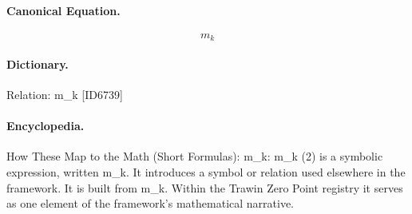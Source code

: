 \paragraph{Canonical Equation.}
\[
m_k
\]

\paragraph{Dictionary.}
Relation: m\_k [ID6739]

\paragraph{Encyclopedia.}
How These Map to the Math (Short Formulas): m\_k: m\_k (2) is a symbolic expression, written m\_k. It introduces a symbol or relation used elsewhere in the framework. It is built from m\_k. Within the Trawin Zero Point registry it serves as one element of the framework's mathematical narrative.
